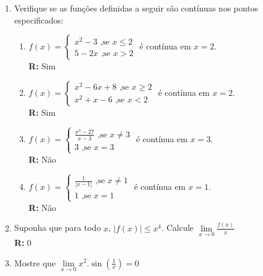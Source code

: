\documentclass[oneside,a4paper,12pt]{article}
\begin{document}
\begin{enumerate}
	\item Verifique se as funções definidas a seguir são contínuas nos pontos especificados:
		\begin{enumerate}
			\item $f(x) = \begin{cases}
			x^2 - 3 \text{ ,se } x \leq 2 \\
			5-2x	\text{ ,se } x > 2
			\end{cases}
			$ é contínua em $x=2$. \\ {\bf R:} Sim
			\item $f(x) = \begin{cases}
			x^2 - 6x + 8 \text{ ,se } x \geq 2 \\
			x^2 + x - 6 \text{ ,se } x < 2
			\end{cases}
			$ é contínua em $x = 2$. \\ {\bf R:} Sim
			\item $f(x) = \begin{cases}
			\frac{x^3 - 27}{x-3} \text{ ,se } x \neq 3 \\
			3	\text{ ,se } x = 3
			\end{cases}
			$ é contínua em $x=3$. \\ {\bf R:} Não
			\item $f(x) = \begin{cases}
			\frac{1}{|x-1|}	\text{ ,se } x \neq 1 \\
			1	\text{ ,se } x = 1
			\end{cases}
			$ é contínua em $x=1$. \\ {\bf R:} Não
		\end{enumerate}

	
	\item Suponha que para todo $x$, $|f(x)| \leq x^4$. Calcule $\lim\limits_{x\rightarrow 0}\frac{f(x)}{x}$ \\ {\bf R:} 0
	
	\item Mostre que $\lim\limits_{x\rightarrow 0}x^2.\sin(\frac{1}{x}) = 0$



\end{enumerate}


	
\end{document}
